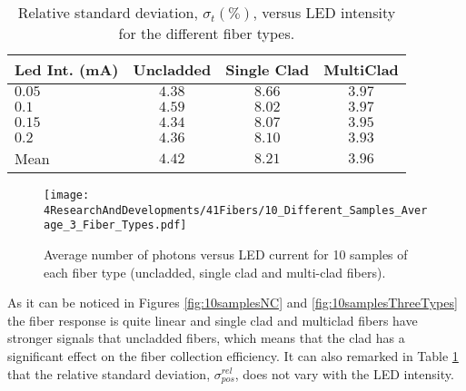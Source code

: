 \begin{table}[h]
\centering{}%
\begin{tabular}{lccc}
\toprule 
Led Int. (mA) & Uncladded & Single Clad & MultiClad \tabularnewline
\midrule
\midrule 
$0.05$ & $4.38$ & $8.66$ & $3.97$ \tabularnewline
$0.1$ & $4.59$ & $8.02$ & $3.97$ \tabularnewline
$0.15$ & $4.34$ & $8.07$ & $3.95$ \tabularnewline
$0.2$ & $4.36$ & $8.10$ & $3.93$ \tabularnewline
Mean & $4.42$ & $8.21$ & $3.96$ \tabularnewline
\bottomrule
\end{tabular}
\caption{Relative standard deviation, $\sigma_t(\%)$, versus LED intensity for the different fiber types.}
\label{tab:RelativeStandardDeviation3FiberTypes}
\end{table}

\begin{figure}[h]
\centering
\texttt{[image: 4ResearchAndDevelopments/41Fibers/10\_Different\_Samples\_Average\_3\_Fiber\_Types.pdf]}
\caption{Average number of photons versus LED current for 10 samples of each fiber type (uncladded, single clad and multi-clad fibers).\label{fig:AveregeThreeFiberTypes}}
\end{figure}

As it can be noticed in Figures \ref{fig:10samplesNC} and \ref{fig:10samplesThreeTypes} the fiber response is quite linear and single clad and multiclad fibers have stronger signals that uncladded fibers, which means that the clad has a significant effect on the fiber collection efficiency. It can also remarked in Table \ref{tab:RelativeStandardDeviation3FiberTypes} that the relative standard deviation, $\sigma^{rel}_{pos}$, does not vary with the LED intensity.



